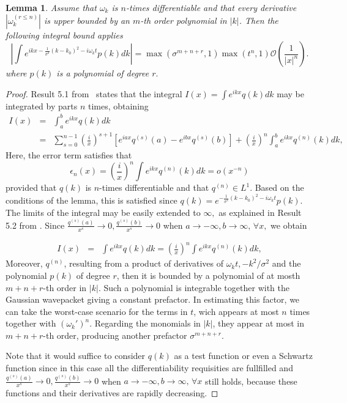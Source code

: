\documentclass[notitlepage, prx, preprint, amsmath,superscriptaddress,amssymb]{revtex4-1}
\newtheorem{lemma}{Lemma}[section]
\begin{document}
\begin{lemma}
\label{lemma:bounds}
Assume that $\omega_k$ is $n$-times differentiable and  that every derivative $|\omega_k^{(r\leq n)}|$ is upper bounded by an $m$-th order polynomial in $|k|$. Then the following integral bound applies
\begin{equation}
\left|\int e^{i k x - \frac{1}{\sigma^2}{(k-k_0)^2} - i \omega_k t} p(k)dk\right|
=\max(\sigma^{m+n + r},1) \max(t^n,1) \mathcal{O}\left(\frac{1}{|x|^n}\right).
\end{equation} where $p(k)$ is a polynomial of degree $r.$
\end{lemma}

\begin{proof}
Result 5.1 from\ \cite{Olver} states that the integral $I(x) = \int e^{i k x} q(k) dk$ may be integrated by parts $n$ times, obtaining
\begin{eqnarray*}
I(x) &=& \int_a^b e^{i k x} q(k) dk \\
&=&\sum_{s=0}^{n-1} \left(\frac{i}{x}\right)^{s+1} \left[e^{iax} q^{(s)}(a) - e^{ibx} q^{(s)}(b) \right] + \left(\frac{i}{x}\right)^n \int_a^b  e^{ikx} q^{(n)}(k)dk,
\end{eqnarray*} Here, the error term satisfies that
$$ \epsilon_n(x) =  \left(\frac{i}{x}\right)^n\int e^{ikx} q^{(n)}(k)dk = o(x^{-n})$$
provided that $q(k)$ is $n$-times differentiable and that $q^{(n)} \in L^1$. Based on the conditions of the lemma, this is satisfied since $q(k)=e^{- \frac{1}{\sigma^2}{(k-k_0)^2} - i \omega_k t} p(k)$. The limits of the integral may be easily extended to $\infty,$ as explained in Result 5.2 from \cite{Olver}. Since $\frac{q^{(s)}(a)}{x^s} \to 0,  \frac{q^{(s)}(b)}{x^s} \to 0$ when $a\to -\infty, b\to \infty, \, \forall x, $ we obtain

\begin{eqnarray*}
I(x) &=& \int e^{i k x} q(k) dk = \left(\frac{i}{x}\right)^n \int e^{ikx} q^{(n)}(k)dk,
\end{eqnarray*}
Moreover, $q^{(n)}$, resulting from a product of derivatives of $\omega_k t, -k^2/\sigma^2$ and the polynomial $p(k)$ of degree $r$, then it is bounded by a polynomial of at mosth $m+n + r$-th order in $|k|.$ Such a polynomial is integrable together with the Gaussian wavepacket giving a constant prefactor. In estimating this factor, we can take the worst-case scenario for the terms in $t$, wich appears at most $n$ times together with $(\omega_k')^n$. Regarding the monomials in $|k|$, they appear at most in $m+n + r$-th order, producing another prefactor $\sigma^{m+n+ r}$.

Note that it would suffice to consider $q(k)$ as a test function or even a Schwartz function since in this case all the differentiability requisities are fullfilled and  $\frac{q^{(s)}(a)}{x^s} \to 0,  \frac{q^{(s)}(b)}{x^s} \to 0$ when $a\to -\infty, b\to \infty, \, \forall x $ still holds, because these functions and their derivatives are rapidly decreasing.

\end{proof}
\end{document}
